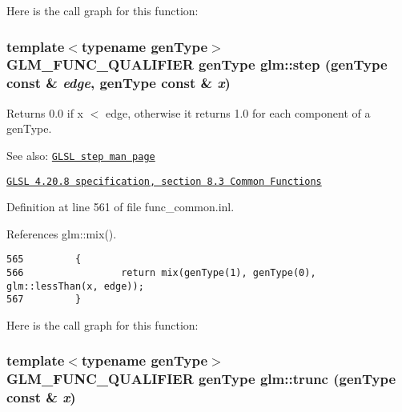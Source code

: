 Here is the call graph for this function:\hypertarget{group__core__func__common_gcc889b24788725c04a80e29f6cc62c1e}{
\subsubsection[step]{\setlength{\rightskip}{0pt plus 5cm}template$<$typename genType$>$ GLM\_\-FUNC\_\-QUALIFIER genType glm::step (genType const \& {\em edge}, \/  genType const \& {\em x})}}
\label{group__core__func__common_gcc889b24788725c04a80e29f6cc62c1e}


Returns 0.0 if x $<$ edge, otherwise it returns 1.0 for each component of a genType.

\begin{Desc}
\item[See also:]\href{http://www.opengl.org/sdk/docs/manglsl/xhtml/step.xml}{\tt GLSL step man page} 

\href{http://www.opengl.org/registry/doc/GLSLangSpec.4.20.8.pdf}{\tt GLSL 4.20.8 specification, section 8.3 Common Functions} \end{Desc}


Definition at line 561 of file func\_\-common.inl.

References glm::mix().

\begin{Code}\begin{verbatim}565         {
566                 return mix(genType(1), genType(0), glm::lessThan(x, edge));
567         }
\end{verbatim}
\end{Code}




Here is the call graph for this function:\hypertarget{group__core__func__common_g30f4c901cd3ebdd26e8f0a73f15c1e89}{
\subsubsection[trunc]{\setlength{\rightskip}{0pt plus 5cm}template$<$typename genType$>$ GLM\_\-FUNC\_\-QUALIFIER genType glm::trunc (genType const \& {\em x})}}
\label{group__core__func__common_g30f4c901cd3ebdd26e8f0a73f15c1e89}


